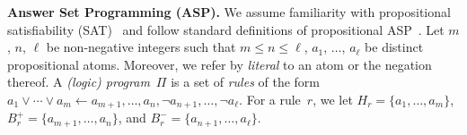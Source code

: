 \documentclass{svproc}
\def\SAT{\textsf{SAT}\xspace}
\begin{document}
\smallskip
\noindent\textbf{Answer Set Programming (ASP).} %
%
We assume familiarity with propositional satisfiability (\SAT)~\cite{KleineBuningLettman99}
and follow standard definitions of propositional ASP~\cite{BrewkaEiterTruszczynski11}.
%
Let $m$, $n$, $\ell$ be non-negative integers such that
$m \leq n \leq \ell$, $a_1$, $\ldots$, $a_\ell$ be distinct propositional
atoms. Moreover, we refer by \emph{literal} to an atom or the negation
thereof.
%
A \emph{(logic) program}~$\Pi$ is a set of \emph{rules} of the form
%
\(
a_1\vee \cdots \vee a_m \leftarrow a_{m+1}, \ldots, a_{n}, \neg
a_{n+1}, \ldots, \neg a_\ell.
%
\)
%
%
%
%
%
%
%
%
%
For a rule~$r$, we let $H_r = \{a_1, \ldots, a_m\}$,
$B^+_r = \{a_{m+1}, \ldots, a_{n}\}$, and
$B^-_r = \{a_{n+1}, \ldots, a_\ell\}$.
%
\end{document}
